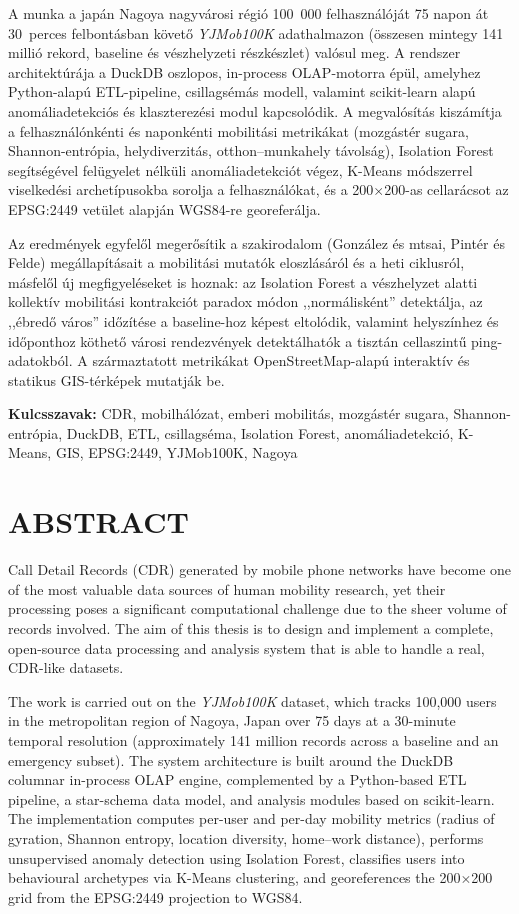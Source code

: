 A munka a japán Nagoya nagyvárosi régió 100~000 felhasználóját 75 napon át 30~perces felbontásban követő \textit{YJMob100K} adathalmazon (összesen mintegy 141 millió rekord, baseline és vészhelyzeti részkészlet) valósul meg. A rendszer architektúrája a DuckDB oszlopos, in-process OLAP-motorra épül, amelyhez Python-alapú ETL-pipeline, csillagsémás modell, valamint scikit-learn alapú anomáliadetekciós és klaszterezési modul kapcsolódik. A megvalósítás kiszámítja a felhasználónkénti és naponkénti mobilitási metrikákat (mozgástér sugara, Shannon-entrópia, helydiverzitás, otthon--munkahely távolság), Isolation Forest segítségével felügyelet nélküli anomáliadetekciót végez, K-Means módszerrel viselkedési archetípusokba sorolja a felhasználókat, és a 200$\times$200-as cellarácsot az EPSG:2449 vetület alapján WGS84-re georeferálja.

Az eredmények egyfelől megerősítik a szakirodalom (González és mtsai, Pintér és Felde) megállapításait a mobilitási mutatók eloszlásáról és a heti ciklusról, másfelől új megfigyeléseket is hoznak: az Isolation Forest a vészhelyzet alatti kollektív mobilitási kontrakciót paradox módon ,,normálisként'' detektálja, az ,,ébredő város'' időzítése a baseline-hoz képest eltolódik, valamint helyszínhez és időponthoz köthető városi rendezvények detektálhatók a tisztán cellaszintű ping-adatokból. A származtatott metrikákat OpenStreetMap-alapú interaktív és statikus GIS-térképek mutatják be.

\vspace{0.5em}
\noindent\textbf{Kulcsszavak:} CDR, mobilhálózat, emberi mobilitás, mozgástér sugara, Shannon-entrópia, DuckDB, ETL, csillagséma, Isolation Forest, anomáliadetekció, K-Means, GIS, EPSG:2449, YJMob100K, Nagoya

\newpage
\section*{ABSTRACT}

Call Detail Records (CDR) generated by mobile phone networks have become one of the most valuable data sources of human mobility research, yet their processing poses a significant computational challenge due to the sheer volume of records involved. The aim of this thesis is to design and implement a complete, open-source data processing and analysis system that is able to handle a real, CDR-like datasets.

The work is carried out on the \textit{YJMob100K} dataset, which tracks 100{,}000 users in the metropolitan region of Nagoya, Japan over 75 days at a 30-minute temporal resolution (approximately 141 million records across a baseline and an emergency subset). The system architecture is built around the DuckDB columnar in-process OLAP engine, complemented by a Python-based ETL pipeline, a star-schema data model, and analysis modules based on scikit-learn. The implementation computes per-user and per-day mobility metrics (radius of gyration, Shannon entropy, location diversity, home--work distance), performs unsupervised anomaly detection using Isolation Forest, classifies users into behavioural archetypes via K-Means clustering, and georeferences the 200$\times$200 grid from the EPSG:2449 projection to WGS84.

